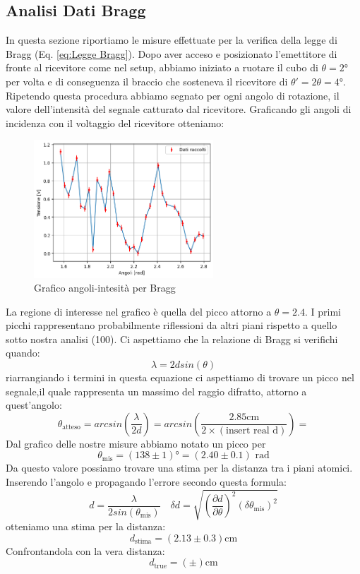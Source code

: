 \documentclass[letterpaper,12pt]{article}
\begin{document}
\newpage
\subsection{Analisi Dati Bragg}
In questa sezione riportiamo le misure effettuate per la verifica della legge di Bragg (Eq. \ref{eq:Legge Bragg}). Dopo aver acceso e posizionato l'emettitore di fronte al ricevitore come nel setup, abbiamo iniziato a ruotare il cubo di $\theta = 2\text{°}$ per volta e di conseguenza il braccio che sosteneva il ricevitore di $\theta' = 2\theta = 4\text{°}$.
Ripetendo questa procedura abbiamo segnato per ogni angolo di rotazione, il valore dell'intensità del segnale catturato dal ricevitore.
Graficando gli angoli di incidenza con il voltaggio del ricevitore otteniamo: 
\begin{figure}[h!]
	\centering
	\includegraphics[width = 0.6\textwidth]{Grafico1_bragg.png}
	\caption{Grafico angoli-intesità per Bragg}
	\label{fig:GraficoBragg3}
\end{figure}

La regione di interesse nel grafico è quella del picco attorno a $\theta=2.4$. I primi picchi rappresentano probabilmente riflessioni da altri piani rispetto a quello sotto nostra analisi (100).
Ci aspettiamo che la relazione di Bragg si verifichi quando:
$$ \lambda = 2dsin(\theta) $$
riarrangiando i termini in questa equazione ci aspettiamo di trovare un picco nel segnale,il quale rappresenta un massimo del raggio difratto, attorno a quest'angolo:
$$ \theta_\text{atteso} = arcsin(\frac{\lambda}{2d}) = arcsin(\frac{2.85\text{cm}}{2\times(\text{insert real d})}) =  $$ 
Dal grafico delle nostre misure abbiamo notato un picco per $$\theta_\text{mis} = (138 \pm1)\text{°} = (2.40 \pm0.1)\text{ rad}$$
Da questo valore possiamo trovare una stima per la distanza tra i piani atomici.
Inserendo l'angolo e propagando l'errore secondo questa formula: 
$$ d = \frac{\lambda}{2sin(\theta_\text{mis})} \quad \delta d = \sqrt{\left( \frac{\partial d}{\partial \theta} \right)^2 (\delta \theta_\text{mis})^2} $$ 
otteniamo una stima per la distanza: $$ d_\text{stima} = (2.13 \pm0.3) \text{cm} $$ 	
Confrontandola con la vera distanza: $$ d_\text{true} = ( \pm) \text{cm} $$ 
\end{document}
